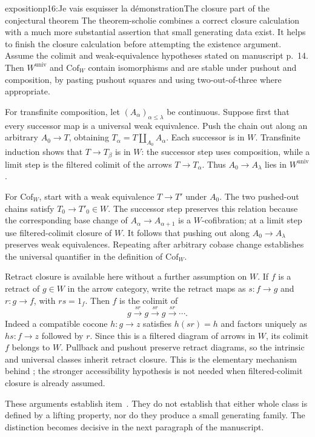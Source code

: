 \begin{dcomment}{exposition}{p16:Je vais esquisser la démonstration}{The closure part of the conjectural theorem}
The theorem-scholie combines a correct closure calculation with a much more substantial assertion that small generating data exist. It helps to finish the closure calculation before attempting the existence argument. Assume the colimit and weak-equivalence hypotheses stated on manuscript p.~14. Then $W^{\mathrm{univ}}$ and $\mathrm{Cof}_W$ contain isomorphisms and are stable under pushout and composition, by pasting pushout squares and using two-out-of-three where appropriate.

For transfinite composition, let $(A_\alpha)_{\alpha\leq\lambda}$ be continuous. Suppose first that every successor map is a universal weak equivalence. Push the chain out along an arbitrary $A_0\to T$, obtaining $T_\alpha=T\amalg_{A_0}A_\alpha$. Each successor is in $W$. Transfinite induction shows that $T\to T_\beta$ is in $W$: the successor step uses composition, while a limit step is the filtered colimit of the arrows $T\to T_\alpha$. Thus $A_0\to A_\lambda$ lies in $W^{\mathrm{univ}}$.

For $\mathrm{Cof}_W$, start with a weak equivalence $T\to T'$ under $A_0$. The two pushed-out chains satisfy $T_0\to T'_0\in W$. The successor step preserves this relation because the corresponding base change of $A_\alpha\to A_{\alpha+1}$ is a $W$-cofibration; at a limit step use filtered-colimit closure of $W$. It follows that pushing out along $A_0\to A_\lambda$ preserves weak equivalences. Repeating after arbitrary cobase change establishes the universal quantifier in the definition of $\mathrm{Cof}_W$.

Retract closure is available here without a further assumption on $W$. If $f$ is a retract of $g\in W$ in the arrow category, write the retract maps as $s:f\to g$ and $r:g\to f$, with $rs=1_f$. Then $f$ is the colimit of
\[
 g\xrightarrow{sr}g\xrightarrow{sr}g\xrightarrow{sr}\cdots.
\]
Indeed a compatible cocone $h:g\to z$ satisfies $h(sr)=h$ and factors uniquely as $hs:f\to z$ followed by $r$. Since this is a filtered diagram of arrows in $W$, its colimit $f$ belongs to $W$. Pullback and pushout preserve retract diagrams, so the intrinsic and universal classes inherit retract closure. This is the elementary mechanism behind \citet[Proposition~1.19]{Beke2000}; the stronger accessibility hypothesis is not needed when filtered-colimit closure is already assumed.

These arguments establish item~. They do not establish that either whole class is defined by a lifting property, nor do they produce a small generating family. The distinction becomes decisive in the next paragraph of the manuscript.
\end{dcomment}


